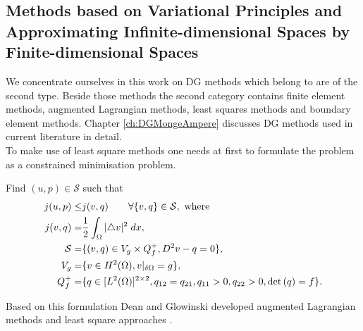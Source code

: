 \subsection{Methods based on Variational Principles and Approximating Infinite-dimensional Spaces by Finite-dimensional Spaces}
 We concentrate ourselves in this work on DG methods which belong to are of the second type. Beside those methods the second category contains finite element methods, augmented Lagrangian methods, least squares methods and boundary element methods. Chapter \ref{ch:DGMongeAmpere} discusses DG methods used in current literature in detail.\\
To make use of least square methods one needs at first to formulate the \MA problem as a constrained minimisation problem.
\begin{definition}
Find $(u,p) \in \mathcal{S}$ such that
\begin{align}
	j(u,p) \leq& j(v,q) \qquad \forall \{v,q\} \in \mathcal{S}, \text{ where }\\
	j(v,q)  =& \frac 1 2 \int_{\Omega} {{|\triangle v |^2}\;dx}, \\
	\mathcal{S} =& \{(v,q)\in V_g \times Q^+_f, D^2v-q =0\},\\
	V_g =& \{v \in H^2(\Omega), v \arrowvert_{\delta \Omega}=g\}, \\
	Q^+_f =& \{q \in [L^2(\Omega)]^{2\times2} , q_{12} =q_{21},  q_{11} > 0,q_{22} > 0, \det{\left(q\right)} = f\}.
\end{align}

\end{definition}
Based on this formulation Dean and Glowinski developed augmented Lagrangian methods and least square approaches \cite{DG2004,DG2006,DG2006a}.

